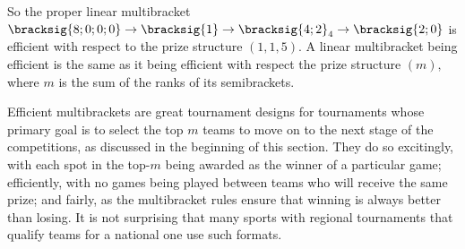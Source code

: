 {    So the proper linear multibracket $\bracksig{8;0;0;0} \to \bracksig{1} \to \bracksig{4;2}_4 \to \bracksig{2;0}$ is efficient with respect to the prize structure $(1, 1, 5).$ A linear multibracket being efficient is the same as it being efficient with respect the prize structure $(m),$ where $m$ is the sum of the ranks of its semibrackets.

    Efficient multibrackets are great tournament designs for tournaments whose primary goal is to select the top $m$ teams to move on to the next stage of the competitions, as discussed in the beginning of this section. They do so excitingly, with each spot in the top-$m$ being awarded as the winner of a particular game; efficiently, with no games being played between teams who will receive the same prize; and fairly, as the multibracket rules ensure that winning is always better than losing. It is not surprising that many sports with regional tournaments that qualify teams for a national one use such formats.
}